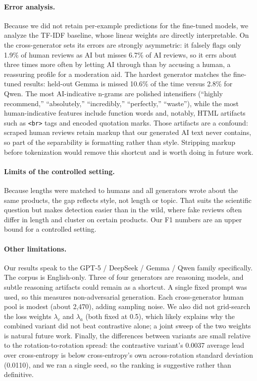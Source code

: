 \documentclass[manuscript,nonacm]{acmart}
\begin{document}
\paragraph{Error analysis.}
Because we did not retain per-example predictions for the fine-tuned models, we
analyze the TF-IDF baseline, whose linear weights are directly interpretable. On
the cross-generator sets its errors are strongly asymmetric: it falsely flags
only 1.9\% of human reviews as AI but misses 6.7\% of AI reviews, so it errs
about three times more often by letting AI through than by accusing a human, a
reassuring profile for a moderation aid. The hardest generator matches the
fine-tuned results: held-out Gemma is missed 10.6\% of the time versus 2.8\% for
Qwen. The most AI-indicative n-grams are polished intensifiers (``highly
recommend,'' ``absolutely,'' ``incredibly,'' ``perfectly,'' ``waste''), while
the most human-indicative features include function words and, notably, HTML
artifacts such as \texttt{<br>} tags and encoded quotation marks. Those artifacts
are a confound: scraped human reviews retain markup that our generated AI text
never contains, so part of the separability is formatting rather than style.
Stripping markup before tokenization would remove this shortcut and is worth
doing in future work.

\paragraph{Limits of the controlled setting.}
Because lengths were matched to humans and all generators wrote about the same
products, the gap reflects style, not length or topic. That suits the scientific
question but makes detection easier than in the wild, where fake reviews often
differ in length and cluster on certain products. Our F1 numbers are an upper
bound for a controlled setting.

\paragraph{Other limitations.}
Our results speak to the GPT-5 / DeepSeek / Gemma / Qwen family specifically.
The corpus is English-only. Three of four
generators are reasoning models, and subtle reasoning artifacts could remain as a
shortcut. A single fixed prompt was used, so this measures non-adversarial
generation. Each cross-generator human pool is modest (about 2{,}470), adding
sampling noise. We also did not grid-search the loss weights $\lambda_c$ and
$\lambda_a$ (both fixed at 0.5), which likely explains why the combined variant
did not beat contrastive alone; a joint sweep of the two weights is natural
future work. Finally, the differences between variants are small relative to the
rotation-to-rotation spread: the contrastive variant's 0.0037 average lead over
cross-entropy is below cross-entropy's own across-rotation standard deviation
(0.0110), and we ran a single seed, so the ranking is suggestive rather than
definitive.
\end{document}
